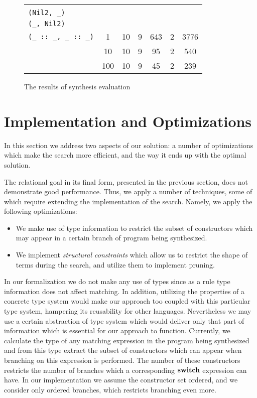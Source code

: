 \begin{figure}[t]
\begin{tabular}{|m{3cm}|cc||cccc|}
{{\lstinline[basicstyle=\scriptsize]|(_, Nil)|\\[-1mm]
\lstinline[basicstyle=\scriptsize]|(Nil2, _)|\\[-1mm]
\lstinline[basicstyle=\scriptsize]|(_, Nil2)|\\[-1mm]
\lstinline[basicstyle=\scriptsize]|(_ :: _, _ :: _)|}}
         & 1&10&9&643&2&3776\\[3mm]
        \cline{2-7}
      &10&10&9&95&2&540\\[3mm]
        \cline{2-7}
     &100&10&9&45&2&239                    \\ \hline
  \end{tabular}
  \caption{The results of synthesis evaluation}
  \label{fig:eval}

\end{figure}


\section{Implementation and Optimizations}
\label{sec:optimization}

In this section we address two aspects of our solution: a number of optimizations which make the search more efficient, and
the way it ends up with the optimal solution.

The relational goal in its final form, presented in the previous section, does not demonstrate good performance. Thus, we apply a number
of techniques, some of which require extending the implementation of the search. Namely, we apply the following optimizations:

\begin{itemize}
\item We make use of type information to restrict the subset of constructors which may appear in a certain branch of
  program being synthesized.
\item We implement \emph{structural constraints} which allow us to restrict the shape of terms during the search, and
  utilize them to implement pruning.  
\end{itemize}

In our formalization we do not make any use of types since as a rule type information does not affect matching. In addition,
utilizing the properties of a concrete type system would make our approach too coupled with this particular type system, hampering
its reusability for other languages. Nevertheless we may use a certain abstraction of type system which would deliver only
that part of information which is essential for our approach to function. Currently, we calculate the type of any matching expression in
the program being synthesized and from this type extract the subset of constructors which can appear when branching on this expression
is performed. The number of these constructors restricts the number of branches which a corresponding $\mathbf{switch}$ expression can have.
In our implementation we assume the constructor set ordered, and we consider only ordered branches, which restricts branching even more.

